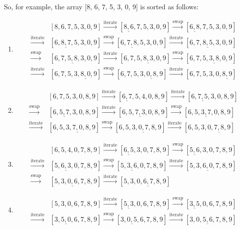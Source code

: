 \documentclass[a4paper]{article}
\begin{document}
So, for example, the array [8, 6, 7, 5, 3, 0, 9] is sorted as follows:
\begin{enumerate}
\item 
\begin{align*}&[8,6,7,5,3,0,9]\xrightarrow{\text{iterate}}[\underline
{8,6},7,5,3,0,9]\xrightarrow{\text{swap}}[\underline{6,8},7,5,3,0,9]\\
\xrightarrow{\text{iterate}}&[6,\underline{8,7},5,3,0,9]\xrightarrow{\text{swap}}[6,\underline{7,8},5,3,0,9]\xrightarrow{\text{iterate}}[6,7,\underline{8,5},3,0,9]\\
\xrightarrow{\text{swap}}&[6,7,\underline{5,8},3,0,9]\xrightarrow{\text{iterate}}[6,7,5,\underline{8,3},0,9]\xrightarrow{\text{swap}}[6,7,5,\underline{3,8},0,9]\\
\xrightarrow{\text{iterate}}&[6,7,5,3,\underline{8,0},9]\xrightarrow{\text{swap}}[6,7,5,3,\underline{0,8},9]\xrightarrow{\text{iterate}}[6,7,5,3,0,\underline{8,9}]
\end{align*}

\item
\begin{align*}
&[6,7,5,3,0,8,9]\xrightarrow{\text{iterate}}[\underline{6,7},5,4,0,8,9]\xrightarrow{\text{iterate}}[6,\underline{7,5},3,0,8,9]\\
\xrightarrow{\text{swap}}&[6,\underline{5,7},3,0,8,9]\xrightarrow{\text{iterate}}[6,5,\underline{7,3},0,8,9]\xrightarrow{\text{swap}}[6,5,\underline{3,7},0,8,9]\\
\xrightarrow{\text{iterate}}&[6,5,3,\underline{7,0},8,9]\xrightarrow{\text{swap}}[6,5,3,\underline{0,7},8,9]\xrightarrow{\text{iterate}}[6,5,3,0,\underline{7,8},9]
\end{align*}

\item
\begin{align*}
&[6,5,4,0,7,8,9]\xrightarrow{\text{iterate}}[\underline{6,5},3,0,7,8,9]\xrightarrow{\text{swap}}[\underline{5,6},3,0,7,8,9]\\
\xrightarrow{\text{iterate}}&[5,\underline{6,3},0,7,8,9]\xrightarrow{\text{swap}}[5,\underline{3,6},0,7,8,9]\xrightarrow{\text{iterate}}[5,3,\underline{6,0},7,8,9]\\
\xrightarrow{\text{swap}}&[5,3,\underline{0,6},7,8,9]\xrightarrow{\text{iterate}}[5,3,0,\underline{6,7},8,9]
\end{align*}

\item
\begin{align*}
&[5,3,0,6,7,8,9]\xrightarrow{\text{iterate}}[\underline{5,3},0,6,7,8,9]\xrightarrow{\text{swap}}[\underline{3,5},0,6,7,8,9]\\
\xrightarrow{\text{iterate}}&[3,\underline{5,0},6,7,8,9]\xrightarrow{\text{swap}}[3,\underline{0,5},6,7,8,9]\xrightarrow{\text{iterate}}[3,0,\underline{5,6},7,8,9]
\end{align*}


\end{enumerate}
\end{document}
